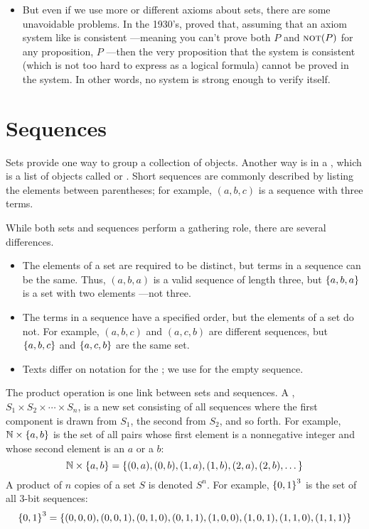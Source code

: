 \begin{itemize}
\item But even if we use more or different axioms about sets, there are
  some unavoidable problems.  In the 1930's,  proved that,
  assuming that an axiom system like  is consistent ---meaning
  you can't prove both $P$ and $\mathop{\mathrm{\textsc{not}}}(P)$ for any proposition, $P$ ---then
  the very proposition that the system is consistent (which is not too
  hard to express as a logical formula) cannot be proved in the system.
  In other words, no  system is strong enough to verify
  itself.
  
\end{itemize}

\section{Sequences}

Sets provide one way to group a collection of objects.  Another way is
in a , which is a list of objects called 
or .  Short sequences are commonly described by
listing the elements between parentheses; for example, $(a, b, c)$ is
a sequence with three terms.

While both sets and sequences perform a gathering role, there are
several differences.
\begin{itemize}

\item The elements of a set are required to be distinct, but terms in a
sequence can be the same.  Thus, $(a, b, a)$ is a valid sequence of length
three, but $\left\{a, b, a\right\}$ is a set with two elements ---not three.

\item The terms in a sequence have a specified order, but the elements
of a set do not.  For example, $(a, b, c)$ and $(a, c, b)$ are
different sequences, but $\left\{a, b, c\right\}$ and $\left\{a, c, b\right\}$ are the
same set.

\item Texts differ on notation for the ; we use
  \term{$\lambda$} for the empty sequence.
\end{itemize}

The product operation is one link between sets and sequences.  A
, $S_1 \times S_2 \times \cdots \times S_n$, is a
new set consisting of all sequences where the first component is drawn
from $S_1$, the second from $S_2$, and so forth.  For example, $\mathbb{N}
\times \left\{a,b\right\}$ is the set of all pairs whose first element is a
nonnegative integer and whose second element is an $a$ or a $b$:
\[
\mathbb{N} \times \left\{a,b\right\}
    = \left\{(0,a), (0,b), (1,a), (1,b), (2,a), (2, b), \dots\right\}
\]
A product of $n$ copies of a set $S$ is denoted $S^n$.  For example,
$\left\{0, 1\right\}^3$ is the set of all $3$-bit sequences:
\[
\left\{0, 1\right\}^3 = \left\{ (0,0,0), (0,0,1), (0,1,0), (0,1,1),
                     (1,0,0), (1,0,1), (1,1,0), (1,1,1) \right\}
\]

